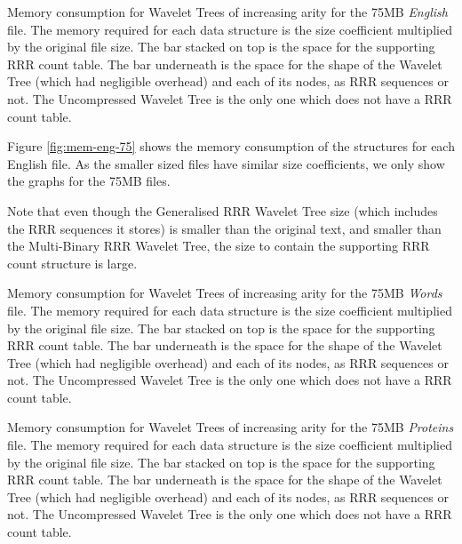 \clearpage
			{Memory consumption for Wavelet Trees of increasing arity for
			the 75MB \emph{English} file. 
			The memory required for each data structure is the size coefficient 
			multiplied by the original file size.
			The bar stacked on top is the space for
			the supporting RRR count table. The bar underneath is the space for
			the shape of the Wavelet Tree (which had negligible overhead) and 
			each of its
			nodes, as RRR sequences or not. The Uncompressed Wavelet Tree is
			the only one which does not have a RRR count table.}
		
Figure \ref{fig:mem-eng-75} shows the memory consumption of the structures for 
each English file. As the smaller sized files have similar size coefficients, we
only show the graphs for the 75MB files.

Note that even though the Generalised RRR Wavelet Tree size (which 
includes the RRR sequences it stores) is smaller than the original text, and 
smaller than the Multi-Binary RRR Wavelet Tree, the size to contain the 
supporting RRR count structure is large.

			{Memory consumption for Wavelet Trees of increasing arity for
			the 75MB \emph{Words} file. The memory required for each data 
			structure is the size coefficient 
			multiplied by the original file size.
			The bar stacked on top is the space for
			the supporting RRR count table. The bar underneath is the space for
			the shape of the Wavelet Tree (which had negligible overhead) and 
			each of its
			nodes, as RRR sequences or not. The Uncompressed Wavelet Tree is
			the only one which does not have a RRR count table.}

			{Memory consumption for Wavelet Trees of increasing arity for
			the 75MB \emph{Proteins} file. The memory required for each data 
			structure is the size coefficient 
			multiplied by the original file size.
			The bar stacked on top is the space for
			the supporting RRR count table. The bar underneath is the space for
			the shape of the Wavelet Tree (which had negligible overhead) and 
			each of its
			nodes, as RRR sequences or not. The Uncompressed Wavelet Tree is
			the only one which does not have a RRR count table.}
		
